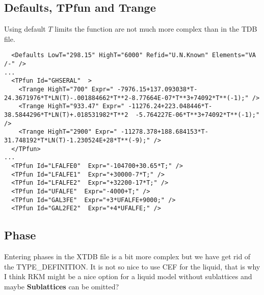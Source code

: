 \documentclass{article}
\begin{document}
\begin{appendices}
\newpage 

\subsection{Defaults, TPfun and Trange}

Using default $T$ limits the function are not much more complex than
in the TDB file.

{\small
\begin{verbatim}
  <Defaults LowT="298.15" HighT="6000" Refid="U.N.Known" Elements="VA /-" />
...
  <TPfun Id="GHSERAL"  >
    <Trange HighT="700" Expr=" -7976.15+137.093038*T-24.3671976*T*LN(T)-.001884662*T**2-8.77664E-07*T**3+74092*T**(-1);" />
    <Trange HighT="933.47" Expr=" -11276.24+223.048446*T-38.5844296*T*LN(T)+.018531982*T**2  -5.764227E-06*T**3+74092*T**(-1);" />
    <Trange HighT="2900" Expr=" -11278.378+188.684153*T-31.748192*T*LN(T)-1.230524E+28*T**(-9);" />
  </TPfun>
...
  <TPfun Id="LFALFE0"  Expr="-104700+30.65*T;" />
  <TPfun Id="LFALFE1"  Expr="+30000-7*T;" />
  <TPfun Id="LFALFE2"  Expr="+32200-17*T;" />
  <TPfun Id="UFALFE"  Expr="-4000+T;" />
  <TPfun Id="GAL3FE"  Expr="+3*UFALFE+9000;" />
  <TPfun Id="GAL2FE2"  Expr="+4*UFALFE;" />
\end{verbatim}
}


\newpage 

\subsection{Phase}\label{sec:phase example}

Entering phases in the XTDB file is a bit more complex but we have get
rid of the TYPE\_DEFINITION.  It is not so nice to use CEF for the
liquid, that is why I think RKM might be a nice option for a liquid
model without sublattices and maybe {\bf Sublattices} can be omitted?


\end{appendices}
\end{document}
